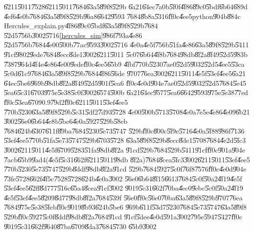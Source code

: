 \U{6211}\U{5011}\U{7528}\U{6211}\U{5011}\U{7684}\U{63a5}\U{89f8}\U{529b}%
\U{6a21}\U{64ec}\U{7a0b}\U{5f0f}\U{4f86}\U{89c0}\U{5bdf}\U{6b64}\U{689d}%
\U{4ef6}\U{4e0b}\U{7684}\U{63a5}\U{89f8}\U{529b}\U{96a8}\U{6642}\U{9593}%
\U{7684}\U{8b8a}\U{5316}\U{ff0c}\U{4ee5}python\U{904b}\U{884c}%
Hercules\_explain.py\U{4f86}\U{89c0}\U{5bdf}\U{63a5}\U{89f8}\U{529b}\U{7684}%
\U{52d5}\U{756b}\U{3002}\U{5716}\ref{hercules_sim}\U{986f}\U{793a}\U{4e86}%
\U{52d5}\U{756b}\U{7684}\U{4e00}\U{500b}\U{77ac}\U{9593}\U{3002}\U{5716}%
\U{4e0a}\U{4e5f}\U{756b}\U{51fa}\U{4e86}\U{63a5}\U{89f8}\U{529b}\U{5411}%
\U{91cf}\U{9802}\U{9ede}\U{7684}\U{8ecc}\U{8de1}\U{3002}\U{6211}\U{5011}%
\U{5c07}\U{6b64}\U{4f8b}\U{7684}\U{98db}\U{8f2a}\U{8f49}\U{52d5}\U{983b}%
\U{7387}\U{964d}\U{4f4e}\U{4e86}\U{4e00}\U{9ede}\U{ff0c}\U{4ee5}\U{65b9}%
\U{4fbf}\U{770b}\U{5230}\U{7ae0}\U{52d5}\U{9032}\U{52d5}\U{4ee5}\U{53ca}%
\U{5c0d}\U{61c9}\U{7684}\U{63a5}\U{89f8}\U{529b}\U{7684}\U{4f86}\U{56de}%
\U{9707}\U{76ea}\U{3002}\U{6211}\U{5011}\U{4e5f}\U{53ef}\U{4ee5}\U{6a21}%
\U{64ec}\U{5be6}\U{969b}\U{98db}\U{8f2a}\U{8f49}\U{52d5}\U{901f}\U{5ea6}%
\U{ff0c}\U{4e0d}\U{904e}\U{7ae0}\U{52d5}\U{9032}\U{52d5}\U{7684}\U{5e45}%
\U{5ea6}\U{5c31}\U{6703}\U{975e}\U{5e38}\U{5c0f}\U{3002}\U{6574}\U{500b}%
\U{6a21}\U{64ec}\U{9577}\U{5ea6}\U{6642}\U{9593}\U{975e}\U{5e38}\U{77ed}%
\U{ff0c}\U{53ea}\U{6709}0.9\U{79d2}\U{ff0c}\U{6211}\U{5011}\U{53ef}\U{4ee5}%
\U{770b}\U{5230}\U{63a5}\U{89f8}\U{529b}\U{5c31}\U{5df2}\U{7d93}\U{5728}%
\U{4e00}\U{500b}\U{5713}\U{5708}\U{4e0a}\U{7e5e}\U{4e86}\U{4e09}\U{6b21}%
\U{3002}\U{56e0}\U{6b64}\U{4e8b}\U{5be6}\U{4e0a}\U{5927}\U{529b}\U{58eb}%
\U{7684}\U{624b}\U{6307}\U{611f}\U{89ba}\U{7684}\U{5230}\U{5e73}\U{5747}%
\U{529b}\U{ff0c}\U{800c}\U{5f9e}\U{5716}\U{4e0a}\U{5f88}\U{986f}\U{7136}%
\U{53ef}\U{4ee5}\U{770b}\U{51fa}\U{5e73}\U{5747}\U{529b}\U{6703}\U{5728}%
\U{63a5}\U{89f8}\U{529b}\U{8ecc}\U{8de1}\U{5708}\U{7684}\U{4e2d}\U{5fc3}%
\U{3002}\U{6211}\U{5011}\U{4e5f}\U{6709}\U{5283}\U{51fa}\U{98db}\U{8f2a}%
\U{91cd}\U{529b}\U{7684}\U{529b}\U{5411}\U{91cf}\U{ff0c}\U{901a}\U{904e}%
\U{7acb}\U{65b9}\U{9ad4}(\U{4e5f}\U{5c31}\U{662f}\U{6211}\U{5011}\U{98db}%
\U{8f2a})\U{7684}\U{8cea}\U{5fc3}\U{3002}\U{6211}\U{5011}\U{53ef}\U{4ee5}%
\U{770b}\U{5230}\U{5e73}\U{5747}\U{529b}\U{8ddf}\U{98db}\U{8f2a}\U{91cd}%
\U{529b}\U{7684}\U{5927}\U{5c0f}\U{76f8}\U{7576}\U{ff0c}\U{4e0d}\U{904e}%
\U{73fe}\U{5728}\U{662f}\U{4f5c}\U{7528}\U{5728}\U{624b}\U{4e0a}\U{3002}%
\U{56e0}\U{6b64}\U{8f15}\U{6613}\U{7684}\U{5c0f}\U{50a2}\U{4f19}\U{4e5f}%
\U{53ef}\U{4ee5}\U{62ff}\U{8d77}7\U{516c}\U{65a4}\U{8cea}\U{91cf}\U{3002}%
\U{9019}\U{5c31}\U{662f}\U{70ba}\U{4ec0}\U{9ebc}\U{5c0f}\U{50a2}\U{4f19}%
\U{4e5f}\U{53ef}\U{4ee5}\U{8209}\U{8d77}\U{98db}\U{8f2a}\U{7684}\U{539f}%
\U{56e0}\U{ff0c}\U{56e0}\U{70ba}\U{63a5}\U{89f8}\U{529b}\U{9707}\U{76ea}%
\U{7684}\U{975e}\U{5e38}\U{5feb}\U{ff0c}\U{9019}\U{8b93}\U{624b}\U{5be6}%
\U{969b}\U{611f}\U{53d7}\U{5230}\U{7684}\U{5e73}\U{5747}\U{63a5}\U{89f8}%
\U{529b}\U{ff0c}\U{5927}\U{5c0f}\U{8ddf}\U{98db}\U{8f2a}\U{7684}\U{91cd}%
\U{91cf}\U{5dee}\U{4e0d}\U{591a}\U{3002}\U{795e}\U{5947}\U{5427}\U{ff0c}%
\U{9019}\U{5c31}\U{662f}\U{9640}\U{87ba}\U{6709}\U{8da3}\U{7684}\U{5730}%
\U{65b9}\U{3002}

